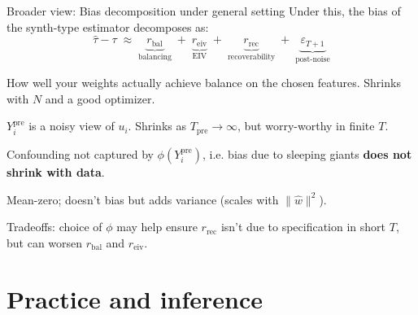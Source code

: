\documentclass[handout,xcolor=dvipsnames,pdftex,hyperref={colorlinks=false}]{beamer}
\newcommand\smallunskip{\vspace{-.25\baselineskip}}
\renewcommand{\epsilon}{\varepsilon}
\newcommand{\ypre}{Y^{\text{pre}}_i}      %
\newcommand{\reiv}{r_{\text{eiv}}}        %
\newcommand{\rrec}{r_{\text{rec}}}        %
\begin{document}
\begin{frame}{Broader view: Bias decomposition under general setting}
 Under this, the bias of the synth-type estimator decomposes as:
\[
\widehat\tau - \tau \;\approx\; \underbrace{r_{\text{bal}}}_{\text{balancing}} \;+\; \underbrace{\reiv}_{\text{EIV}} \;+\; \underbrace{\rrec}_{\text{recoverability}} \;+\; \underbrace{\epsilon_{T+1}}_{\text{post-noise}}
\]
\small
{}
\begin{description}\smallunskip
\item[$r_{\text{bal}}$] How well your weights actually achieve balance on the chosen features. Shrinks with $N$ and a good optimizer.
\item[$\reiv$] $\ypre$ is a noisy view of $u_i$. Shrinks as $T_{\text{pre}} \to \infty$, but worry-worthy in finite $T$.
\item[$\rrec$] Confounding not captured by $\phi(\ypre)$, i.e. bias due to sleeping giants \textbf{does not shrink with data}.
\item[$\epsilon_{T+1}$] Mean-zero; doesn't bias but adds variance (scales with $\|\hat w\|^2$).
\end{description}
\small
{} Tradeoffs:  choice of $\phi$ may help ensure $\rrec$ isn't due to specification in short $T$, but can worsen $r_{\text{bal}}$ and $\reiv$. 
\end{frame}

\section{Practice and inference}
\end{document}
